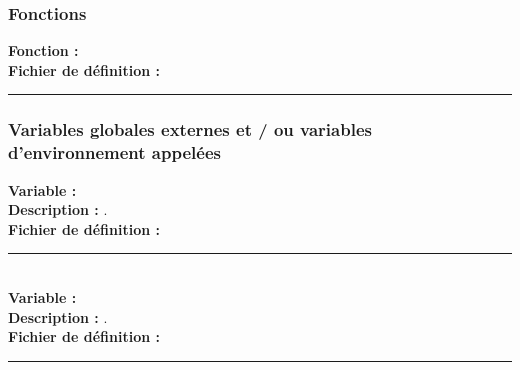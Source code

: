 \documentclass[a4paper,10pt]{article}
\begin{document}
\color{blue}
\subsubsection{Fonctions}\color{white}

\textbf{Fonction : \color{mauve}}\\[1\baselineskip]

\textbf{Fichier de définition :} \textbf{\color{lime}}\\[1\baselineskip]


\color{blue}\par\noindent\rule{\textwidth}{0.4pt}\color{white}

\color{blue}
\subsubsection{Variables globales externes et / ou variables d'environnement appelées}\color{white}

\textbf{Variable : \color{orange}}\\[1\baselineskip]

\textbf{Description :} .\\[1\baselineskip]

\textbf{Fichier de définition : \color{lime}}\\[1\baselineskip]



\par\noindent\rule{\textwidth}{0.4pt}\\[1\baselineskip]

\textbf{Variable : \color{orange}}\\[1\baselineskip]

\textbf{Description :} .\\[1\baselineskip]

\textbf{Fichier de définition : \color{lime}}\\[1\baselineskip]





\color{red}\par\noindent\rule{\textwidth}{0.4pt}\color{white}
\end{document}
